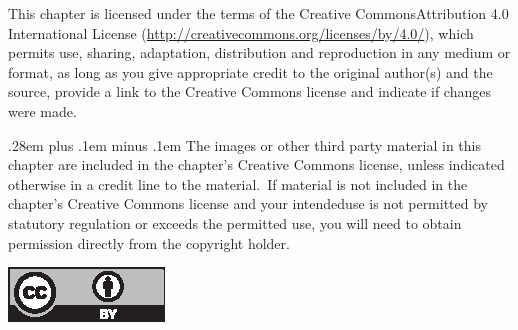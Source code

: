 \documentclass[runningheads]{llncs}
\newif\iffullversion
\begin{document}



\vfill

{\small\medskip{} This chapter is licensed under the terms of the Creative Commons\break Attribution 4.0 International License (\url{http://creativecommons.org/licenses/by/4.0/}), which permits use, sharing, adaptation, distribution and reproduction in any medium or format, as long as you give appropriate credit to the original author(s) and the source, provide a link to the Creative Commons license and indicate if changes were made.}

{\small \spaceskip .28em plus .1em minus .1em The images or other third party material in this chapter are included in the chapter's Creative Commons license, unless indicated otherwise in a credit line to the material.~If material is not included in the chapter's Creative Commons license and your intended\break use is not permitted by statutory regulation or exceeds the permitted use, you will need to obtain permission directly from the copyright holder.}

\medskip\noindent\includegraphics{cc_by_4-0}
\newpage
\iffullversion\fi
\end{document}
